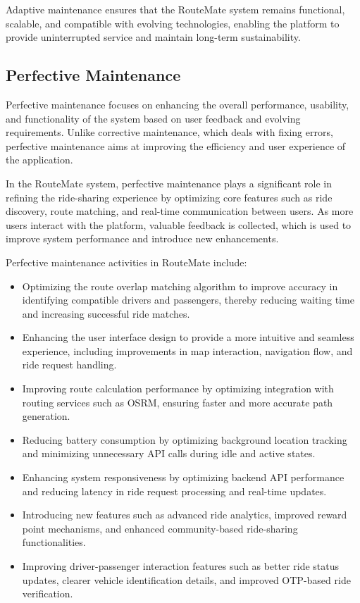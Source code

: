 \documentclass[10pt,a4paper]{report}
\begin{document}
\justify\large Adaptive maintenance ensures that the RouteMate system remains functional, scalable, and compatible with evolving technologies, enabling the platform to provide uninterrupted service and maintain long-term sustainability.


\subsection{Perfective Maintenance}

\justify\large Perfective maintenance focuses on enhancing the overall performance, usability, and functionality of the system based on user feedback and evolving requirements. Unlike corrective maintenance, which deals with fixing errors, perfective maintenance aims at improving the efficiency and user experience of the application.

\justify\large In the RouteMate system, perfective maintenance plays a significant role in refining the ride-sharing experience by optimizing core features such as ride discovery, route matching, and real-time communication between users. As more users interact with the platform, valuable feedback is collected, which is used to improve system performance and introduce new enhancements.

\justify\large Perfective maintenance activities in RouteMate include:

\begin{itemize}

\item Optimizing the route overlap matching algorithm to improve accuracy in identifying compatible drivers and passengers, thereby reducing waiting time and increasing successful ride matches.

\item Enhancing the user interface design to provide a more intuitive and seamless experience, including improvements in map interaction, navigation flow, and ride request handling.

\item Improving route calculation performance by optimizing integration with routing services such as OSRM, ensuring faster and more accurate path generation.

\item Reducing battery consumption by optimizing background location tracking and minimizing unnecessary API calls during idle and active states.

\item Enhancing system responsiveness by optimizing backend API performance and reducing latency in ride request processing and real-time updates.

\item Introducing new features such as advanced ride analytics, improved reward point mechanisms, and enhanced community-based ride-sharing functionalities.

\item Improving driver-passenger interaction features such as better ride status updates, clearer vehicle identification details, and improved OTP-based ride verification.

\end{itemize}
\end{document}
